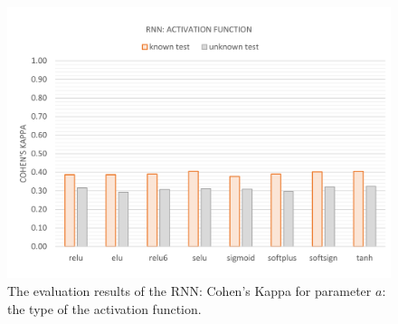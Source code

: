 \vspace{-11mm}
\begin{figure}[H]
	\centering\includegraphics[width=\textwidth]{images/evaluation_rnn_a_k}
	\caption[RNN Evaluation: Activation Function]{The evaluation results of the RNN: Cohen's Kappa for parameter $a$: the type of the activation function.}
	\label{f.evaluation.rnn.a.k}
\end{figure}

